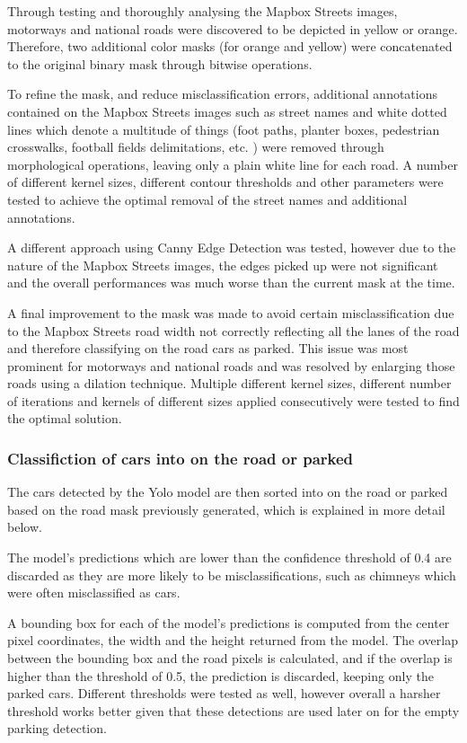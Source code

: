 Through testing and thoroughly analysing the Mapbox Streets images, motorways and national roads were discovered to be depicted in yellow or orange. Therefore, two additional color masks (for orange and yellow) were concatenated to the original binary mask through bitwise operations.

To refine the mask, and reduce misclassification errors, additional annotations contained on the Mapbox Streets images such as street names and white dotted lines which denote a multitude of things (foot paths, planter boxes, pedestrian crosswalks, football fields delimitations, etc. ) were removed through morphological operations, leaving only a plain white line for each road.
A number of different kernel sizes, different contour thresholds and other parameters were tested to achieve the optimal removal of the street names and additional annotations.

A different approach using Canny Edge Detection was tested, however due to the nature of the Mapbox Streets images, the edges picked up were not significant and the overall performances was much worse than the current mask at the time.

A final improvement to the mask was made to avoid certain misclassification due to the Mapbox Streets road width not correctly reflecting all the lanes of the road and therefore classifying on the road cars as parked. This issue was most prominent for motorways and national roads and was resolved by enlarging those roads using a dilation technique. Multiple different kernel sizes, different number of iterations and kernels of different sizes applied consecutively were tested to find the optimal solution.

\subsubsection{Classifiction of cars into on the road or parked}
The cars detected by the Yolo model are then sorted into on the road or parked based on the road mask previously generated, which is explained in more detail below.

The model's predictions which are lower than the confidence threshold of 0.4 are discarded as they are more likely to be misclassifications, such as chimneys which were often misclassified as cars.

A bounding box for each of the model's predictions is computed from the center pixel coordinates, the width and the height returned from the model.
The overlap between the bounding box and the road pixels is calculated, and if the overlap is higher than the threshold of 0.5, the prediction is discarded, keeping only the parked cars.
Different thresholds were tested as well, however overall a harsher threshold works better given that these detections are used later on for the empty parking detection.

